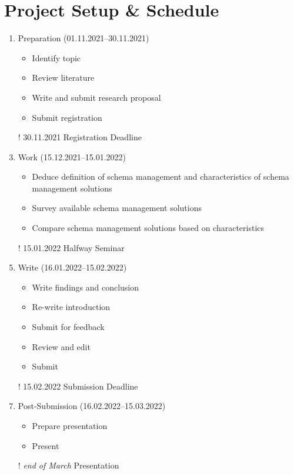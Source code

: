 
\section{Project Setup \& Schedule}\label{sec:project-setup}

\begin{enumerate}
  \item Preparation (01.11.2021--30.11.2021)
  \begin{itemize}
    \item Identify topic
    \item Review literature
    \item Write and submit research proposal
    \item Submit registration
  \end{itemize}
  \item[!] 30.11.2021 Registration Deadline
  \item Work (15.12.2021--15.01.2022)
  \begin{itemize}
    \item Deduce definition of schema management and characteristics of schema management solutions
    \item Survey available schema management solutions
    \item Compare schema management solutions based on characteristics
  \end{itemize}
  \item[!] 15.01.2022 Halfway Seminar
  \item Write (16.01.2022--15.02.2022)
  \begin{itemize}
    \item Write findings and conclusion
    \item Re-write introduction
    \item Submit for feedback
    \item Review and edit
    \item Submit
  \end{itemize}
  \item[!] 15.02.2022 Submission Deadline
  \item Post-Submission (16.02.2022--15.03.2022)
  \begin{itemize}
    \item Prepare presentation
    \item Present
  \end{itemize}
  \item[!] \emph{end of March} Presentation
\end{enumerate}
